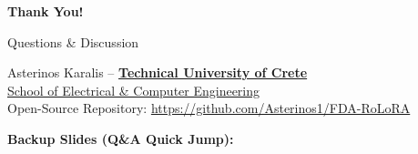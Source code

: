 \documentclass[aspectratio=169]{beamer}
\begin{document}
\begin{frame}[label=thank_you]
    \centering
    \Huge \textbf{Thank You!}
    
    \vspace{0.8em}
    \Large Questions \& Discussion
    
    \vspace{1.2em}
    \normalsize
    Asterinos Karalis -- \href{https://www.tuc.gr/}{\textbf{\color{tucblue}Technical University of Crete}}\\[0.2em]
    \href{https://www.ece.tuc.gr/}{\small \color{tucgray}School of Electrical \& Computer Engineering}\\
    \vspace{0.4em}
    \small Open-Source Repository: \url{https://github.com/Asterinos1/FDA-RoLoRA}
    
    \vspace{1.2em}
    {\scriptsize \color{tucgray} \textbf{Backup Slides (Q\&A Quick Jump):}}\\[0.25em]
    \hyperlink{backup_algo}{} \quad
    \hyperlink{backup_testbed}{} \quad
    \hyperlink{backup_threshold_evolution}{} \quad
    \hyperlink{backup_factor_asymmetry}{} \\[0.25em]
    \hyperlink{backup_noniid_mnli}{} \quad
    \hyperlink{backup_noniid_table}{} \quad
    \hyperlink{backup_iid_table}{} \quad
    \hyperlink{backup_iid_mnli_qnli}{} \quad
    \hyperlink{backup_iid_qqp_sst2}{}
\end{frame}

\appendix
\end{document}
